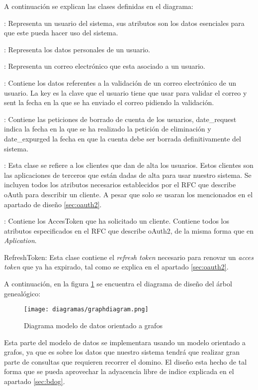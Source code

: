 A continuación se explican las clases definidas en el diagrama:
\begin{description}
	\item[User]: Representa un usuario del sistema, sus atributos son los datos esenciales para que este pueda hacer uso del sistema.
	\item[UserProfile]: Representa los datos personales de un usuario.
	\item[Email]: Representa un correo electrónico que esta asociado a un usuario.
	\item[EmailConfirmation]: Contiene los datos referentes a la validación de un correo electrónico de un usuario. La key es la clave que el usuario tiene que usar para validar el correo y sent la fecha en la que se ha enviado el correo pidiendo la validación.
	\item[UserDeletion]: Contiene las peticiones de borrado de cuenta de los usuarios, date\_request indica la fecha en la que se ha realizado la petición de eliminación y date\_expurged la fecha en que la cuenta debe ser borrada definitivamente del sistema.
	\item[Application]: Esta clase se refiere a los clientes que dan de alta los usuarios. Estos clientes son las aplicaciones de terceros que están dadas de alta para usar nuestro sistema. Se incluyen todos los atributos necesarios establecidos por el RFC que describe oAuth \cite{oauth2rfc} para describir un cliente. A pesar que solo se usaran los mencionados en el apartado de diseño \ref{sec:oauth2}.
	\item[AccesToken]: Contiene los AccesToken que ha solicitado un cliente. Contiene todos los atributos especificados en el RFC que describe oAuth2, de la misma forma que en \textit{Aplication}.
	\item{RefreshToken}: Esta clase contiene el \textit{refresh token} necesario para renovar un \textit{acces token} que ya ha expirado, tal como se explica en el apartado \ref{sec:oauth2}.
\end{description}
\newpage
A continuación, en la figura \ref{fig:graphdiagram} se encuentra el diagrama de diseño del árbol genealógico:

\begin{figure}[ht!]
\center
\texttt{[image: diagramas/graphdiagram.png]}
\caption{Diagrama modelo de datos orientado a grafos}
\label{fig:graphdiagram}
\end{figure}

Esta parte del modelo de datos se implementara usando un modelo orientado a grafos, ya que es sobre los datos que nuestro sistema tendrá que realizar gran parte de consultas que requieren recorrer el domino. El diseño esta hecho de tal forma que se pueda aprovechar la adyacencia libre de indice explicada en el apartado \ref{sec:bdog}.
 
